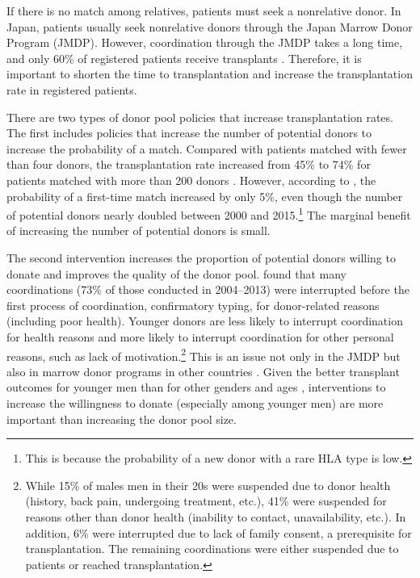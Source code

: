 \documentclass[
  11pt,
  a4paper
]{article}
\begin{document}
If there is no match among relatives, patients must seek a nonrelative donor. In Japan, patients usually seek nonrelative donors through the Japan Marrow Donor Program (JMDP). However, coordination through the JMDP takes a long time, and only 60\% of registered patients receive transplants \citep{Hirakawa2018}. Therefore, it is important to shorten the time to transplantation and increase the transplantation rate in registered patients.

There are two types of donor pool policies that increase transplantation rates. The first includes policies that increase the number of potential donors to increase the probability of a match. Compared with patients matched with fewer than four donors, the transplantation rate increased from 45\% to 74\% for patients matched with more than 200 donors \citep{Hirakawa2018}. However, according to \citet{Takanashi2016}, the probability of a first-time match increased by only 5\%, even though the number of potential donors nearly doubled between 2000 and 2015.\footnote{This is because the probability of a new donor with a rare HLA type is low.} The marginal benefit of increasing the number of potential donors is small.

The second intervention increases the proportion of potential donors willing to donate and improves the quality of the donor pool. \citet{Hirakawa2018} found that many coordinations (73\% of those conducted in 2004--2013) were interrupted before the first process of coordination, confirmatory typing, for donor-related reasons (including poor health). Younger donors are less likely to interrupt coordination for health reasons and more likely to interrupt coordination for other personal reasons, such as lack of motivation.\footnote{While 15\% of males men in their 20s were suspended due to donor health (history, back pain, undergoing treatment, etc.), 41\% were suspended for reasons other than donor health (inability to contact, unavailability, etc.). In addition, 6\% were interrupted due to lack of family consent, a prerequisite for transplantation. The remaining coordinations were either suspended due to patients or reached transplantation.} This is an issue not only in the JMDP but also in marrow donor programs in other countries \citep{Haylock2022}. Given the better transplant outcomes for younger men than for other genders and ages \citep[for example,][]{Kollman2016}, interventions to increase the willingness to donate (especially among younger men) are more important than increasing the donor pool size.
\end{document}

